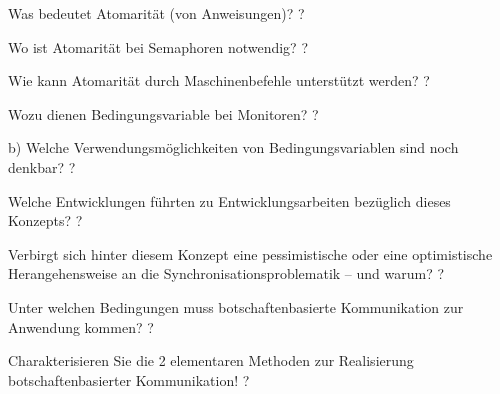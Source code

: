 \documentclass[avery5371]{flashcards}
\begin{document}
\begin{flashcard}{Was bedeutet Atomarität (von Anweisungen)?}
    ?
\end{flashcard}

\begin{flashcard}{Wo ist Atomarität bei Semaphoren notwendig?}
    ?
\end{flashcard}

\begin{flashcard}{Wie kann Atomarität durch Maschinenbefehle unterstützt werden?}
    ?
\end{flashcard}

\begin{flashcard}{Wozu dienen Bedingungsvariable bei Monitoren? }
    ?
\end{flashcard}

\begin{flashcard}{b) Welche Verwendungsmöglichkeiten von Bedingungsvariablen sind noch denkbar?}
    ?
\end{flashcard}
\begin{flashcard}{Welche Entwicklungen führten zu Entwicklungsarbeiten bezüglich dieses Konzepts?}
    ?
\end{flashcard}

\begin{flashcard}{Verbirgt sich hinter diesem Konzept eine pessimistische oder eine optimistische Herangehensweise an die Synchronisationsproblematik – und warum?}
    ?
\end{flashcard}

\begin{flashcard}{Unter welchen Bedingungen muss botschaftenbasierte Kommunikation zur Anwendung kommen?}
    ?
\end{flashcard}

\begin{flashcard}{Charakterisieren Sie die 2 elementaren Methoden zur Realisierung botschaftenbasierter Kommunikation!}
    ?
\end{flashcard}
\end{document}

